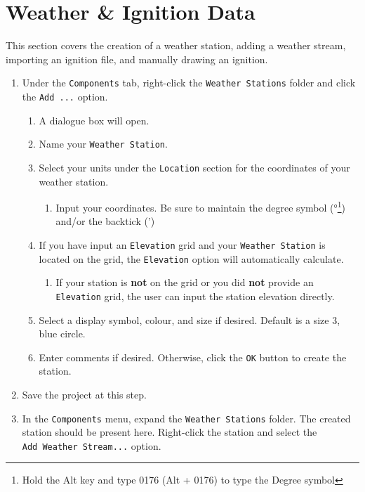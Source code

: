 \documentclass[
  letterpaper,
  DIV=11,
  numbers=noendperiod]{scrreprt}
\providecommand{\tightlist}{%
  \setlength{\itemsep}{0pt}\setlength{\parskip}{0pt}}
\begin{document}
\section{Weather \& Ignition Data}\label{weather-ignition-data}

This section covers the creation of a weather station, adding a weather
stream, importing an ignition file, and manually drawing an ignition.

\begin{enumerate}
\def\labelenumi{\arabic{enumi}.}
\tightlist
\item
  Under the \texttt{Components} tab, right-click the
  \texttt{Weather\ Stations} folder and click the \texttt{Add\ ...}
  option.

  \begin{enumerate}
  \def\labelenumii{\roman{enumii}.}
  \tightlist
  \item
    A dialogue box will open.
  \item
    Name your \texttt{Weather\ Station}.
  \item
    Select your units under the \texttt{Location} section for the
    coordinates of your weather station.

    \begin{enumerate}
    \def\labelenumiii{\alph{enumiii}.}
    \tightlist
    \item
      Input your coordinates. Be sure to maintain the degree symbol
      (°\footnote{Hold the Alt key and type 0176 (Alt + 0176) to type
        the Degree symbol}) and/or the backtick (')
    \end{enumerate}
  \item
    If you have input an \texttt{Elevation} grid and your
    \texttt{Weather\ Station} is located on the grid, the
    \texttt{Elevation} option will automatically calculate.

    \begin{enumerate}
    \def\labelenumiii{\alph{enumiii}.}
    \tightlist
    \item
      If your station is \textbf{not} on the grid or you did
      \textbf{not} provide an \texttt{Elevation} grid, the user can
      input the station elevation directly.
    \end{enumerate}
  \item
    Select a display symbol, colour, and size if desired. Default is a
    size 3, blue circle.
  \item
    Enter comments if desired. Otherwise, click the \texttt{OK} button
    to create the station.
  \end{enumerate}
\item
  Save the project at this step.
\item
  In the \texttt{Components} menu, expand the \texttt{Weather\ Stations}
  folder. The created station should be present here. Right-click the
  station and select the \texttt{Add\ Weather\ Stream...} option.


\end{enumerate}
\end{document}
